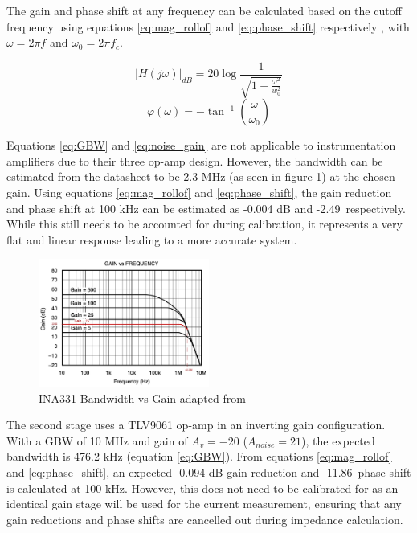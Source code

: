 The gain and phase shift at any frequency can be calculated based on the cutoff frequency using equations \ref{eq:mag_rollof} and \ref{eq:phase_shift} respectively \cite{oljacaOperationalAmplifierGain2010}, with $\omega=2\pi f$ and $\omega_0=2\pi f_c$.

\begin{equation}
    |H(j\omega)|_{dB} = 20\log\frac{1}{\sqrt{1+\frac{\omega^2}{w_0^2}}}
    \label{eq:mag_rollof}
\end{equation}
\begin{equation}
    \varphi(\omega) = -\tan^{-1}(\frac{\omega}{\omega_0})
    \label{eq:phase_shift}
\end{equation}

Equations \ref{eq:GBW} and \ref{eq:noise_gain} are not applicable to instrumentation amplifiers due to their three op-amp design. However, the bandwidth can be estimated from the datasheet to be 2.3 MHz (as seen in figure \ref{fig:ina_bw}) at the chosen gain. Using equations \ref{eq:mag_rollof} and \ref{eq:phase_shift}, the gain reduction and phase shift at 100 kHz can be estimated as -0.004 dB and -2.49\textdegree\ respectively. While this still needs to be accounted for during calibration, it represents a very flat and linear response leading to a more accurate system.

\begin{figure}[H]
    \centering
    \includegraphics[width=0.5\textwidth]{INA_BW.jpeg}
    \caption{INA331 Bandwidth vs Gain adapted from \cite{INA331}}
    \label{fig:ina_bw}
\end{figure}

The second stage uses a TLV9061 op-amp in an inverting gain configuration. With a GBW of 10 MHz and gain of $A_v=-20$ ($A_{noise}=21$), the expected bandwidth is 476.2 kHz (equation \ref{eq:GBW}). From equations \ref{eq:mag_rollof} and \ref{eq:phase_shift}, an expected -0.094 dB gain reduction and -11.86\textdegree\ phase shift is calculated at 100 kHz. However, this does not need to be calibrated for as an identical gain stage will be used for the current measurement, ensuring that any gain reductions and phase shifts are cancelled out during impedance calculation.

